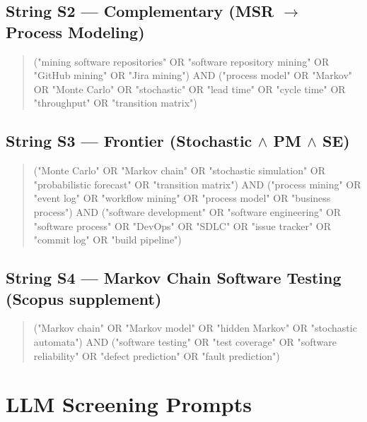 \section{String S2 — Complementary (MSR $\rightarrow$ Process Modeling)}
\label{app:slr-s2}

\begin{quote}
\small\ttfamily
("mining software repositories" OR "software repository mining" OR
"GitHub mining" OR "Jira mining") AND ("process model" OR "Markov" OR
"Monte Carlo" OR "stochastic" OR "lead time" OR "cycle time" OR "throughput"
OR "transition matrix")
\end{quote}

\section{String S3 — Frontier (Stochastic $\wedge$ PM $\wedge$ SE)}
\label{app:slr-s3}

\begin{quote}
\small\ttfamily
("Monte Carlo" OR "Markov chain" OR "stochastic simulation" OR
"probabilistic forecast" OR "transition matrix") AND ("process mining" OR
"event log" OR "workflow mining" OR "process model" OR "business process")
AND ("software development" OR "software engineering" OR "software process"
OR "DevOps" OR "SDLC" OR "issue tracker" OR "commit log" OR "build pipeline")
\end{quote}

\section{String S4 — Markov Chain Software Testing (Scopus supplement)}
\label{app:slr-s4}

\begin{quote}
\small\ttfamily
("Markov chain" OR "Markov model" OR "hidden Markov" OR "stochastic automata")
AND ("software testing" OR "test coverage" OR "software reliability" OR
"defect prediction" OR "fault prediction")
\end{quote}


\chapter{LLM Screening Prompts}
\label{app:F}

